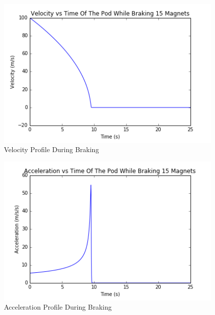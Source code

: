 \documentclass[main.tex]{subfiles}
\begin{document}
 	\begin{figure}
        \centering
        \includegraphics[width=\linewidth]{images/velocity_time_graph}
        \caption{Velocity Profile During Braking}
        \label{fig:velocity-profile}
    \end{figure}
    \begin{figure}
        \centering
        \includegraphics[width=\linewidth]{images/acceleration_time_graph}
        \caption{Acceleration Profile During Braking}
        \label{fig:accelation-profile}
    \end{figure} 
\end{document}

